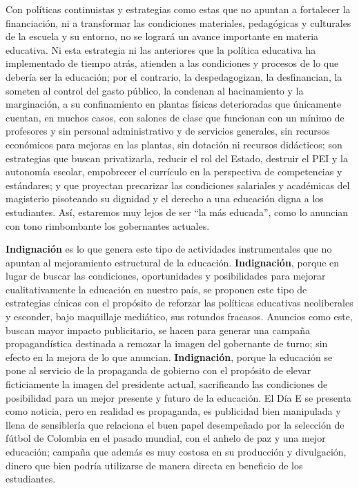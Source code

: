 \documentclass[10pt]{article}
\begin{document}
Con políticas continuistas y estrategias como estas que no apuntan a fortalecer la financiación, ni a transformar las condiciones materiales, pedagógicas y culturales de la
escuela y su entorno, no se logrará un avance importante en materia educativa. Ni esta estrategia ni las anteriores que la política educativa ha implementado de tiempo atrás, atienden a las condiciones y procesos de lo que debería ser la educación; por el contrario, la despedagogizan, la desfinancian, la someten al control del gasto público, la condenan al
hacinamiento y la marginación, a su confinamiento en plantas físicas deterioradas que únicamente cuentan, en muchos casos, con salones de clase que funcionan con un mínimo de profesores y sin personal administrativo y de servicios generales, sin recursos económicos para mejoras en las plantas, sin dotación ni recursos didácticos; son estrategias que buscan privatizarla, reducir el rol del Estado, destruir el PEI y la autonomía escolar, empobrecer el currículo en la perspectiva de competencias y estándares; y que proyectan precarizar las condiciones salariales y académicas del magisterio pisoteando su dignidad y el derecho a una educación digna a los estudiantes. Así, estaremos muy lejos de ser “la más educada”, como lo anuncian con tono rimbombante los gobernantes actuales.

\textbf{Indignación} es lo que genera este tipo de actividades instrumentales que no apuntan al mejoramiento estructural de la educación. \textbf{Indignación}, porque en lugar de buscar las condiciones, oportunidades y posibilidades para mejorar cualitativamente la educación en nuestro país, se proponen este tipo de estrategias cínicas con el propósito de reforzar las
políticas educativas neoliberales y esconder, bajo maquillaje mediático, sus rotundos fracasos. Anuncios como este, buscan mayor impacto publicitario, se hacen para generar una campaña propagandística destinada a remozar la imagen del gobernante de turno; sin efecto en la mejora de lo que anuncian. \textbf{Indignación}, porque la educación se pone al servicio de la propaganda de gobierno con el propósito de elevar ficticiamente la imagen
del presidente actual, sacrificando las condiciones de posibilidad para un mejor presente y futuro de la educación. El Día E se presenta como noticia, pero en realidad es propaganda,
es publicidad bien manipulada y llena de sensiblería que relaciona el buen papel desempeñado por la selección de fútbol de Colombia en el pasado mundial, con el anhelo de paz y una mejor educación; campaña que además es muy costosa en su producción y divulgación, dinero que bien podría utilizarse de manera directa en beneficio de los estudiantes.
\end{document}
